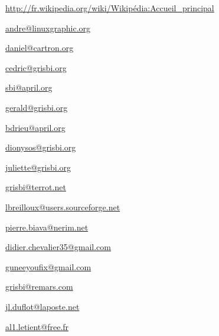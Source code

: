 \urldef{\urlWikipedia}%
\url{http://fr.wikipedia.org/wiki/Wikipédia:Accueil_principal}

\urldef{\urlAndrePascualEmail}%
\url{andre@linuxgraphic.org}%

\urldef{\urlDanielCartronEmail}%
\url{daniel@cartron.org}    %

\urldef{\urlCedricAugerEmail}%
\url{cedric@grisbi.org}     %

\urldef{\urlSebastienBlondeelEmail}%
\url{sbi@april.org}%

\urldef{\urlGeraldNielEmail}%
\url{gerald@grisbi.org}%

\urldef{\urlBenjaminDrieuEmail}%
\url{bdrieu@april.org}     %

\urldef{\urlDionysosEmail}%
\url{dionysos@grisbi.org}     %

\urldef{\urlJulietteEmail}%
\url{juliette@grisbi.org}     %

\urldef{\urlFrancoisTerrotEmail}%
\url{grisbi@terrot.net}     %

\urldef{\urlLoicBreillouxEmail}%
\url{lbreilloux@users.sourceforge.net}    %

\urldef{\urlPierreBiavaEmail}%
\url{pierre.biava@nerim.net}     %

\urldef{\urlDidierChevalierEmail}%
\url{didier.chevalier35@gmail.com}     %

\urldef{\urlWilliamOllivierEmail}%
\url{guneeyoufix@gmail.com}     %

\urldef{\urlMickaelRemarsEmail}%
\url{grisbi@remars.com}     %

\urldef{\urlJeanLucDuflotEmail}%
\url{jl.duflot@laposte.net}     %

\urldef{\urlAlainLetientEmail}%
\url{al1.letient@free.fr}     %

